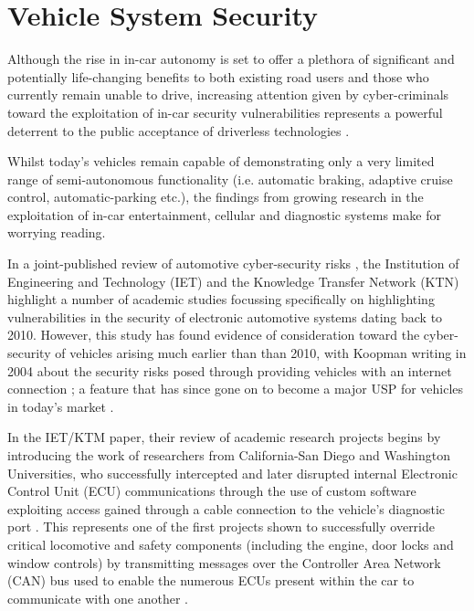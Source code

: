 \documentclass[conference]{IEEEtran}
\begin{document}
 
\section{Vehicle System Security}

Although the rise in in-car autonomy is set to offer a plethora of significant and potentially life-changing benefits to both existing road users and those who currently remain unable to drive, increasing attention given by cyber-criminals toward the exploitation of in-car security vulnerabilities represents a powerful deterrent to the public acceptance of driverless technologies \cite{yagdereli, iet, enev}.

Whilst today's vehicles remain capable of demonstrating only a very limited range of semi-autonomous functionality (i.e. automatic braking, adaptive cruise control, automatic-parking etc.), the findings from growing research in the exploitation of in-car entertainment, cellular and diagnostic systems make for worrying reading. 

In a joint-published review of automotive cyber-security risks \cite{iet}, the Institution of Engineering and Technology (IET) and the Knowledge Transfer Network (KTN) highlight a number of academic studies focussing specifically on highlighting vulnerabilities in the security of electronic automotive systems dating back to 2010. However, this study has found evidence of consideration toward the cyber-security of vehicles arising much earlier than than 2010, with Koopman writing in 2004 about the security risks posed through providing vehicles with an internet connection \cite{koopman-2004}; a feature that has since gone on to become a major USP for vehicles in today's market \cite{onstar}. 

In the IET/KTM paper, their review of academic research projects begins by introducing the work of researchers from California-San Diego and Washington Universities, who successfully intercepted and later disrupted internal Electronic Control Unit (ECU) communications through the use of custom software exploiting access gained through a cable connection to the vehicle's diagnostic port \cite{koscher-1}. This represents one of the first projects shown to successfully override critical locomotive and safety components (including the engine, door locks and window controls) by transmitting messages over the Controller Area Network (CAN) bus used to enable the numerous ECUs present within the car to communicate with one another \cite{iet} \cite{pcworld}. 
\end{document}
